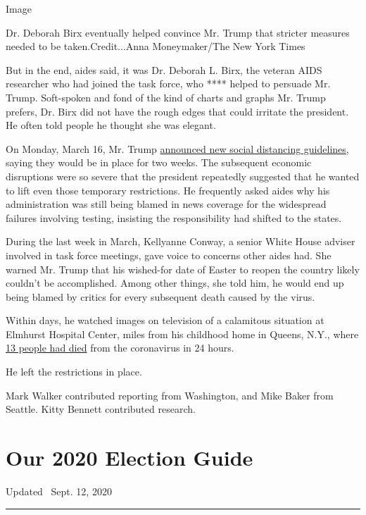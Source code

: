 Image

Dr. Deborah Birx eventually helped convince Mr. Trump that stricter
measures needed to be taken.Credit...Anna Moneymaker/The New York Times

But in the end, aides said, it was Dr. Deborah L. Birx, the veteran AIDS
researcher who had joined the task force, who **** helped to persuade
Mr. Trump. Soft-spoken and fond of the kind of charts and graphs Mr.
Trump prefers, Dr. Birx did not have the rough edges that could irritate
the president. He often told people he thought she was elegant.

On Monday, March 16, Mr. Trump
\href{https://www.nytimes3xbfgragh.onion/2020/03/16/us/politics/trump-coronavirus-guidelines.html}{announced
new social distancing guidelines}, saying they would be in place for two
weeks. The subsequent economic disruptions were so severe that the
president repeatedly suggested that he wanted to lift even those
temporary restrictions. He frequently asked aides why his administration
was still being blamed in news coverage for the widespread failures
involving testing, insisting the responsibility had shifted to the
states.

During the last week in March, Kellyanne Conway, a senior White House
adviser involved in task force meetings, gave voice to concerns other
aides had. She warned Mr. Trump that his wished-for date of Easter to
reopen the country likely couldn't be accomplished. Among other things,
she told him, he would end up being blamed by critics for every
subsequent death caused by the virus.

Within days, he watched images on television of a calamitous situation
at Elmhurst Hospital Center, miles from his childhood home in Queens,
N.Y., where
\href{https://www.nytimes3xbfgragh.onion/2020/03/25/nyregion/nyc-coronavirus-hospitals.html}{13
people had died} from the coronavirus in 24 hours.

He left the restrictions in place.

Mark Walker contributed reporting from Washington, and Mike Baker from
Seattle. Kitty Bennett contributed research.

\hypertarget{our-2020-election-guide}{%
\section{Our 2020 Election Guide}\label{our-2020-election-guide}}

Updated ~Sept. 12, 2020

\begin{center}\rule{0.5\linewidth}{\linethickness}\end{center}

